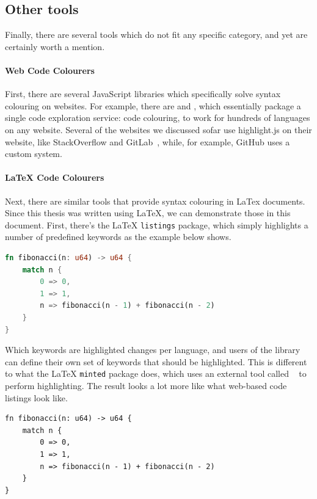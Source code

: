 \subsection{Other tools}

Finally, there are several tools which do not fit any specific category, and yet are certainly worth a mention.

\paragraph{Web Code Colourers}
First, there are several JavaScript libraries which specifically solve syntax colouring on websites.
For example, there are \textcite{highlightjs} and \textcite{prismjs}, which essentially package a single code exploration service: code colouring, to work for hundreds of languages on any website.
Several of the websites we discussed sofar use highlight.js on their website, like StackOverflow and GitLab~\autocite{so_highlightjs, gl_highlightjs}, while, for example, GitHub uses a custom system.

\paragraph{LaTeX Code Colourers}

Next, there are similar tools that provide syntax colouring in LaTex documents.
Since this thesis was written using LaTeX, we can demonstrate those in this document.
First, there's the LaTeX \texttt{listings} package, which simply highlights a number of predefined keywords as the example below shows.

\begin{lstlisting}[language=rust]
fn fibonacci(n: u64) -> u64 {
    match n {
        0 => 0,
        1 => 1,
        n => fibonacci(n - 1) + fibonacci(n - 2)
    }
}
\end{lstlisting}

Which keywords are highlighted changes per language, and users of the library can define their own set of keywords that should be highlighted.
This is different to what the LaTeX \texttt{minted} package does, which uses an external tool called ~\autocite*{pygments} to perform highlighting.
The result looks a lot more like what web-based code listings look like.

\begin{verbatim}
fn fibonacci(n: u64) -> u64 {
    match n {
        0 => 0,
        1 => 1,
        n => fibonacci(n - 1) + fibonacci(n - 2)
    }
}
\end{verbatim}

